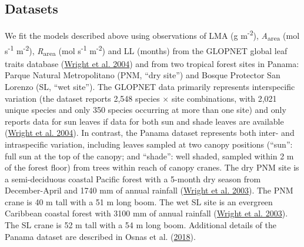 \documentclass[
  12pt,
  letterpaper,
  DIV=11,
  numbers=noendperiod]{scrartcl}
\begin{document}
\hypertarget{datasets}{%
\subsection{Datasets}\label{datasets}}

We fit the models described above using observations of LMA (g
m\textsuperscript{-2}), \emph{A}\textsubscript{area} (mol
s\textsuperscript{-1} m\textsuperscript{-2}),
\emph{R}\textsubscript{area} (mol s\textsuperscript{-1}
m\textsuperscript{-2}) and LL (months) from the GLOPNET global leaf
traits database (\protect\hyperlink{ref-Wright2004a}{Wright et al.
2004}) and from two tropical forest sites in Panama: Parque Natural
Metropolitano (PNM, ``dry site'') and Bosque Protector San Lorenzo (SL,
``wet site''). The GLOPNET data primarily represents interspecific
variation (the dataset reports 2,548 species \(\times\) site
combinations, with 2,021 unique species and only 350 species occurring
at more than one site) and only reports data for sun leaves if data for
both sun and shade leaves are available
(\protect\hyperlink{ref-Wright2004a}{Wright et al. 2004}). In contrast,
the Panama dataset represents both inter- and intraspecific variation,
including leaves sampled at two canopy positions (``sun'': full sun at
the top of the canopy; and ``shade'': well shaded, sampled within 2 m of
the forest floor) from trees within reach of canopy cranes. The dry PNM
site is a semi-deciduous coastal Pacific forest with a 5-month dry
season from December-April and 1740 mm of annual rainfall
(\protect\hyperlink{ref-Wright2003}{Wright et al. 2003}). The PNM crane
is 40 m tall with a 51 m long boom. The wet SL site is an evergreen
Caribbean coastal forest with 3100 mm of annual rainfall
(\protect\hyperlink{ref-Wright2003}{Wright et al. 2003}). The SL crane
is 52 m tall with a 54 m long boom. Additional details of the Panama
dataset are described in Osnas et al.
(\protect\hyperlink{ref-Osnas2018}{2018}).
\end{document}
